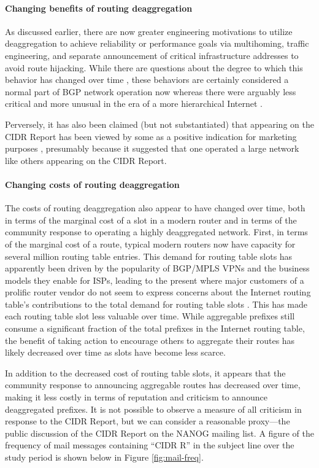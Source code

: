 \paragraph{Changing benefits of routing deaggregation}
As discussed earlier, there are now greater engineering motivations to utilize
deaggregation to achieve reliability or performance goals via multihoming,
traffic engineering, and separate announcement of critical infrastructure
addresses to avoid route hijacking. While there are questions about the degree
to which this behavior has changed over time \cite{Cittadini:2010pi}, these
behaviors are certainly considered a normal part of BGP network operation now
whereas there were arguably less critical and more unusual in the era of a more
hierarchical Internet \cite{Labovitz:2010zr}.

Perversely, it has also been claimed (but not substantiated) that appearing on
the CIDR Report has been viewed by some as a positive indication for marketing
purposes \cite{Smith:2006vn}, presumably because it suggested that one operated
a large network like others appearing on the CIDR Report.

\paragraph{Changing costs of routing deaggregation}
The costs of routing deaggregation also appear to have changed over time, both
in terms of the marginal cost of a slot in a modern router and in terms of the
community response to operating a highly deaggregated network. First, in terms
of the marginal cost of a route, typical modern routers now have capacity for
several million routing table entries. This demand for routing table slots has
apparently been driven by the popularity of BGP/MPLS VPNs \cite{rfc2547} and the
business models they enable for ISPs, leading to the present where major
customers of a prolific router vendor do not seem to express concerns about the
Internet routing table's contributions to the total demand for routing table
slots \cite{Davie:2011uq}. This has made each routing table slot less valuable
over time. While aggregable prefixes still consume a significant fraction
of the total prefixes in the Internet routing table, the benefit of taking
action to encourage others to aggregate their routes has likely decreased over
time as slots have become less scarce.

In addition to the decreased cost of routing table slots, it appears that the
community response to announcing aggregable routes has decreased over time,
making it less costly in terms of reputation and criticism to announce
deaggregated prefixes. It is not possible to observe a measure of all
criticism in response to the CIDR Report, but we can consider a reasonable
proxy---the public discussion of the CIDR Report on the NANOG mailing list. A
figure of the frequency of mail messages containing ``CIDR R'' in the subject
line over the study period is shown below in Figure \ref{fig:mail-freq}.

